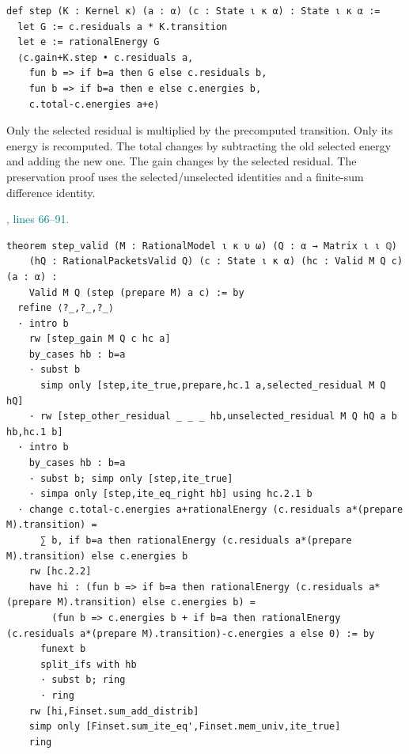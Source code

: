 \documentclass[11pt]{article}\usepackage{needspace}\renewcommand{\paperkind}{Lean companion}\setlength{\parskip}{0.35em}
\begin{document}
\begin{lstlisting}[style=BayesSource]
def step (K : Kernel κ) (a : α) (c : State ι κ α) : State ι κ α :=
  let G := c.residuals a * K.transition
  let e := rationalEnergy G
  ⟨c.gain+K.step • c.residuals a,
    fun b => if b=a then G else c.residuals b,
    fun b => if b=a then e else c.energies b,
    c.total-c.energies a+e⟩
\end{lstlisting}

Only the selected residual is multiplied by the precomputed transition. Only its energy is recomputed. The total changes by subtracting the old selected energy and adding the new one. The gain changes by the selected residual. The preservation proof uses the selected/unselected identities and a finite-sum difference identity.



{\small\textcolor{teal}{, lines 66--91.}\par}

\begin{lstlisting}[style=BayesSource]
theorem step_valid (M : RationalModel ι κ υ ω) (Q : α → Matrix ι ι ℚ)
    (hQ : RationalPacketsValid Q) (c : State ι κ α) (hc : Valid M Q c) (a : α) :
    Valid M Q (step (prepare M) a c) := by
  refine ⟨?_,?_,?_⟩
  · intro b
    rw [step_gain M Q c hc a]
    by_cases hb : b=a
    · subst b
      simp only [step,ite_true,prepare,hc.1 a,selected_residual M Q hQ]
    · rw [step_other_residual _ _ _ hb,unselected_residual M Q hQ a b hb,hc.1 b]
  · intro b
    by_cases hb : b=a
    · subst b; simp only [step,ite_true]
    · simpa only [step,ite_eq_right hb] using hc.2.1 b
  · change c.total-c.energies a+rationalEnergy (c.residuals a*(prepare M).transition) =
      ∑ b, if b=a then rationalEnergy (c.residuals a*(prepare M).transition) else c.energies b
    rw [hc.2.2]
    have hi : (fun b => if b=a then rationalEnergy (c.residuals a*(prepare M).transition) else c.energies b) =
        (fun b => c.energies b + if b=a then rationalEnergy (c.residuals a*(prepare M).transition)-c.energies a else 0) := by
      funext b
      split_ifs with hb
      · subst b; ring
      · ring
    rw [hi,Finset.sum_add_distrib]
    simp only [Finset.sum_ite_eq',Finset.mem_univ,ite_true]
    ring
\end{lstlisting}
\end{document}
